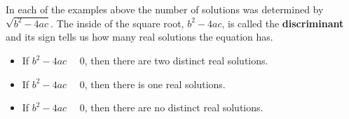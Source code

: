 \documentclass{ximera}
\begin{document}
In each of the examples above the number of solutions was determined by $\sqrt{b^2 - 4 a c}$.  The inside of the square root, $b^2 - 4 a c$, is called the \textbf{discriminant} and its sign tells us how many real solutions the equation has.


\begin{itemize}
\item If $b^2 - 4 a c$ \, \wordChoice{\choice[correct]{$>$}\choice{$=$}\choice{$<$}} \, $0$, then there are two distinct real solutions.
\item If $b^2 - 4 a c$ \, \wordChoice{\choice[correct]{$>$}\choice[correct]{$=$}\choice{$<$}} \, $0$, then there is one real solutions.
\item If $b^2 - 4 a c$ \, \wordChoice{\choice[correct]{$>$}\choice{$=$}\choice[correct]{$<$}} \, $0$, then there are no distinct real solutions.

\end{itemize}
\end{document}
